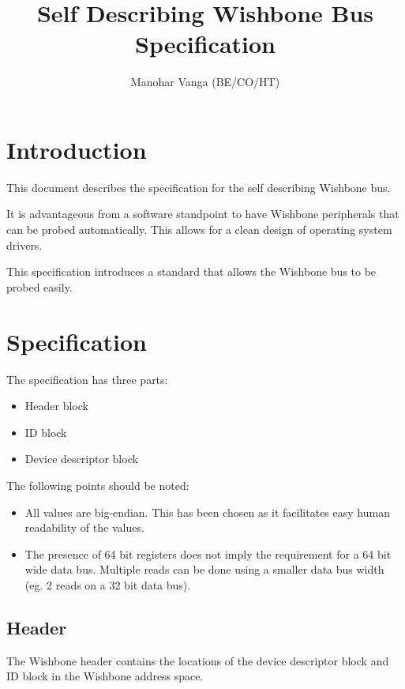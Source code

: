 \documentclass{article}
\title{Self Describing Wishbone Bus Specification}
\author{Manohar Vanga (BE/CO/HT)}
\begin{document}
\maketitle

\tableofcontents
\listoftables
\listoffigures

\pagebreak

\section{Introduction}

This document describes the specification for the self describing Wishbone
bus.

It is advantageous from a software standpoint to have Wishbone peripherals
that can be probed automatically. This allows for a clean design of operating
system drivers.

This specification introduces a standard that allows the Wishbone bus to be
probed easily.

\pagebreak

\section{Specification}

The specification has three parts:

\begin{itemize}
\item Header block
\item ID block
\item Device descriptor block
\end{itemize}

The following points should be noted:

\begin{itemize}
\item All values are big-endian. This has been chosen as it facilitates easy
human readability of the values.
\item The presence of 64 bit registers does not imply the requirement for a
64 bit wide data bus. Multiple reads can be done using a smaller data
bus width (eg. 2 reads on a 32 bit data bus).
\end{itemize}

\subsection{Header}

The Wishbone header contains the locations of the device descriptor block and 
ID block in the Wishbone address space.
\end{document}
